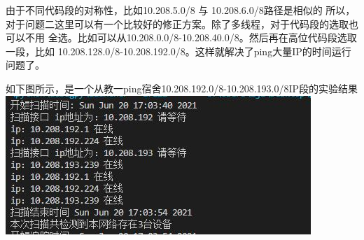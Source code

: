 \documentclass{article} %
\begin{document}
        \par 由于不同代码段的对称性，比如10.208.5.0/8 与 10.208.6.0/8路径是相似的
        所以，对于问题二这里可以有一个比较好的修正方案。除了多线程，对于代码段的选取也可以不用
        全选。比如可以从10.208.0.0/8-10.208.40.0/8。然后再在高位代码段选取一段，比如
        10.208.128.0/8-10.208.192.0/8。这样就解决了ping大量IP的时间运行问题了。
        \par 如下图所示，是一个从教一ping宿舍10.208.192.0/8-10.208.193.0/8IP段的实验结果\\
        \includegraphics[scale=1.0]{pic/ping结果1.JPG}
        
\end{document}
